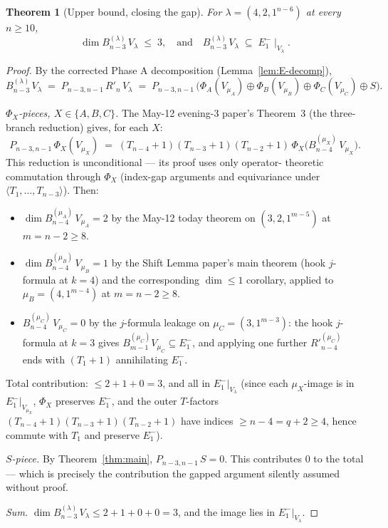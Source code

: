\documentclass[11pt]{article}
\newtheorem{theorem}{Theorem}
\theoremstyle{definition}
\begin{document}
\begin{theorem}[Upper bound, closing the gap]\label{thm:upper}
For $\lambda = (4, 2, 1^{n-6})$ at every $n \ge 10$,
\[
   \dim B^{(\lambda)}_{n-3}\,V_\lambda \;\le\; 3,
   \quad \text{and} \quad
   B^{(\lambda)}_{n-3}\,V_\lambda \;\subseteq\; E_1^-\!\mid_{V_\lambda}.
\]
\end{theorem}

\begin{proof}
By the corrected Phase A decomposition (Lemma~\ref{lem:E-decomp}),
\[
   B^{(\lambda)}_{n-3}\,V_\lambda
   \;=\; P_{n-3, n-1}\,R'_n\,V_\lambda
   \;=\; P_{n-3, n-1}\,\big(\Phi_A(V_{\mu_A}) \oplus \Phi_B(V_{\mu_B})
                            \oplus \Phi_C(V_{\mu_C}) \oplus S\big).
\]

\emph{$\Phi_X$-pieces, $X \in \{A, B, C\}$.} The May-12 evening-3
paper's Theorem~3 (the three-branch reduction) gives, for each $X$:
\[
   P_{n-3, n-1}\,\Phi_X(V_{\mu_X})
   \;=\; (T_{n-4}+1)(T_{n-3}+1)(T_{n-2}+1)\,
         \Phi_X\big(B^{(\mu_X)}_{n-4}\,V_{\mu_X}\big).
\]
This reduction is unconditional --- its proof uses only operator-
theoretic commutation through $\Phi_X$ (index-gap arguments and
equivariance under $\langle T_1, \ldots, T_{n-3}\rangle$). Then:
\begin{itemize}[leftmargin=2em,topsep=0.2em,itemsep=0.1em]
\item $\dim B^{(\mu_A)}_{n-4}\,V_{\mu_A} = 2$ by the May-12 today
theorem on $(3, 2, 1^{m-5})$ at $m = n - 2 \ge 8$.
\item $\dim B^{(\mu_B)}_{n-4}\,V_{\mu_B} = 1$ by the Shift Lemma
paper's main theorem (hook $j$-formula at $k = 4$) and the
corresponding $\dim \le 1$ corollary, applied to $\mu_B = (4, 1^{m-4})$
at $m = n - 2 \ge 8$.
\item $B^{(\mu_C)}_{n-4}\,V_{\mu_C} = 0$ by the
$j$-formula leakage on $\mu_C = (3, 1^{m-3})$: the hook $j$-formula
at $k = 3$ gives $B^{(\mu_C)}_{m-1} V_{\mu_C} \subseteq E_1^-$, and
applying one further $R'^{(\mu_C)}_{n-4}$ ends with $(T_1+1)$
annihilating $E_1^-$.
\end{itemize}
Total contribution: $\le 2 + 1 + 0 = 3$, and all in $E_1^-|_{V_\lambda}$
(since each $\mu_X$-image is in $E_1^-|_{V_{\mu_X}}$, $\Phi_X$ preserves
$E_1^-$, and the outer $T$-factors $(T_{n-4}{+}1)(T_{n-3}{+}1)(T_{n-2}{+}1)$
have indices $\ge n - 4 = q + 2 \ge 4$, hence commute with $T_1$ and
preserve $E_1^-$).

\emph{$S$-piece.} By Theorem~\ref{thm:main}, $P_{n-3, n-1}\,S = 0$.
This contributes $0$ to the total --- which is precisely the
contribution the gapped argument silently assumed without proof.

\emph{Sum.} $\dim B^{(\lambda)}_{n-3}\,V_\lambda \le 2 + 1 + 0 + 0 = 3$,
and the image lies in $E_1^-|_{V_\lambda}$.
\end{proof}
\end{document}
